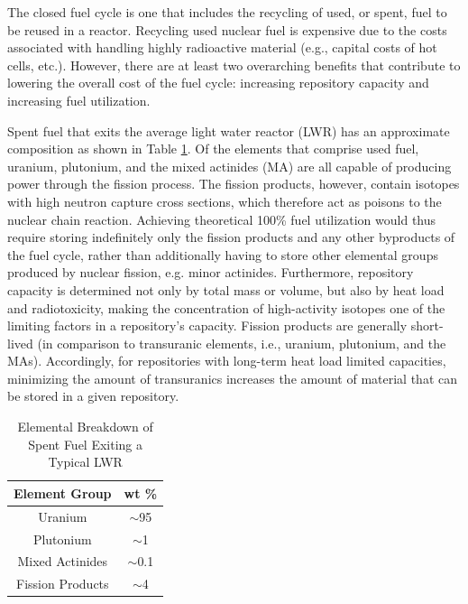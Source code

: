 The closed fuel cycle is one that includes the recycling of used, or spent, fuel
to be reused in a reactor. Recycling used nuclear fuel is expensive due to the
costs associated with handling highly radioactive material (e.g., capital costs
of hot cells, etc.). However, there are at least two overarching benefits that
contribute to lowering the overall cost of the fuel cycle: increasing repository
capacity and increasing fuel utilization.

Spent fuel that exits the average light water reactor (LWR) has an approximate
composition as shown in Table \ref{tab:lwr_fuel}. Of the elements that comprise
used fuel, uranium, plutonium, and the mixed actinides (MA) are all capable of
producing power through the fission process. The fission products, however,
contain isotopes with high neutron capture cross sections, which therefore act
as poisons to the nuclear chain reaction. Achieving theoretical 100\% fuel
utilization would thus require storing indefinitely only the fission products
and any other byproducts of the fuel cycle, rather than additionally having to
store other elemental groups produced by nuclear fission, e.g. minor
actinides. Furthermore, repository capacity is determined not only by total mass
or volume, but also by heat load and radiotoxicity, making the concentration of
high-activity isotopes one of the limiting factors in a repository's
capacity. Fission products are generally short-lived (in comparison to
transuranic elements, i.e., uranium, plutonium, and the MAs). Accordingly, for
repositories with long-term heat load limited capacities, minimizing the amount
of transuranics increases the amount of material that can be stored in a given
repository.

\begin{table} [h]
\centering
\begin{tabular} {|c|c|} 
\hline
Element Group & wt \% \\
\hline
Uranium           & $\sim$95  \\
Plutonium         & $\sim$1   \\
Mixed Actinides   & $\sim$0.1 \\
Fission Products  & $\sim$4   \\
\hline
\end{tabular}
\caption{Elemental Breakdown of Spent Fuel Exiting a Typical LWR}
\label{tab:lwr_fuel}
\end{table}

